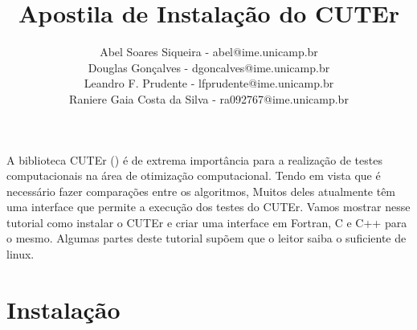 \documentclass[letterpaper,11pt]{article}
\title{Apostila de Instalação do CUTEr}
\author{
Abel Soares Siqueira - {\small abel@ime.unicamp.br} \\ 
Douglas Gonçalves - {\small dgoncalves@ime.unicamp.br} \\
Leandro F. Prudente - {\small lfprudente@ime.unicamp.br} \\
Raniere Gaia Costa da Silva - {\small ra092767@ime.unicamp.br}}
\numberwithin{equation}{section}
\begin{document}
\maketitle
\tableofcontents
\vspace{1 cm}

A biblioteca CUTEr (\cite{bib:cuter1,bib:cuter2}) é de extrema importância para a
realização de testes computacionais na área de otimização computacional. 
Tendo em vista que é necessário fazer comparações entre os algoritmos,
Muitos deles atualmente têm uma interface que permite a execução dos testes
do CUTEr. Vamos mostrar nesse tutorial como instalar o CUTEr e criar uma interface
em Fortran, C e C++ para o mesmo. Algumas partes deste tutorial supõem que o leitor
saiba o suficiente de linux.

\section{Instalação}
\end{document}
